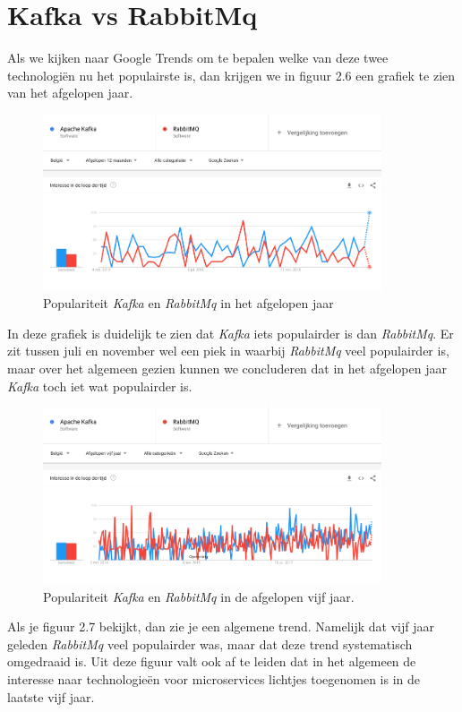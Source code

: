 \section{Kafka vs RabbitMq}
Als we kijken naar Google Trends om te bepalen welke van deze twee technologiën nu het populairste is, dan krijgen we in figuur 2.6 een grafiek te zien van het afgelopen jaar.
 \begin{figure}[h!]
    \centering
    \includegraphics[width=100mm]{../KvsRMQ1.png}
    \caption{Populariteit \emph{Kafka} en \emph{RabbitMq} in het afgelopen jaar}
    
\end{figure}

In deze grafiek is duidelijk te zien dat \emph{Kafka} iets populairder is dan \emph{RabbitMq}. Er zit tussen juli en november wel een piek in waarbij \emph{RabbitMq} veel populairder is, maar over het algemeen gezien kunnen we concluderen dat in het afgelopen jaar \emph{Kafka} toch iet wat populairder is.

 \begin{figure}[h!]
    \centering
    \includegraphics[width=100mm]{../KvsRMQ2.png}
    \caption{Populariteit \emph{Kafka} en \emph{RabbitMq} in de afgelopen vijf jaar.}
    
\end{figure}

Als je figuur 2.7 bekijkt, dan zie je een algemene trend. Namelijk dat vijf jaar geleden \emph{RabbitMq} veel populairder was, maar dat deze trend systematisch omgedraaid is. Uit deze figuur valt ook af te leiden dat in het algemeen de interesse naar technologieën voor microservices lichtjes toegenomen is in de laatste vijf jaar.

